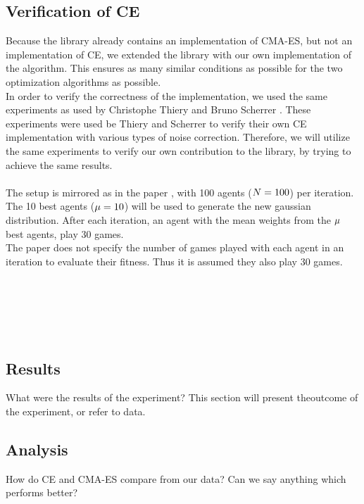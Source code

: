 \subsection{Verification of CE}
Because the \shark library already contains an implementation of 
CMA-ES, but not an implementation of CE, we extended the library 
with our own implementation of the algorithm. 
This ensures as many similar conditions as possible for 
the two optimization algorithms as possible.\\
In order to verify the correctness of the implementation, 
we used the same experiments as used by 
Christophe Thiery and Bruno Scherrer \citep{thiery:09}. 
These experiments were used be Thiery and Scherrer to 
verify their own CE implementation with various types of noise correction. 
Therefore, we will utilize the same experiments to verify our 
own contribution to the \shark library, by trying to achieve the same results.\\
\\
The setup is mirrored as in the paper \citep{thiery:09}, 
with 100 agents ($N = 100$) per iteration. 
The 10 best agents ($\mu = 10$) will be used 
to generate the new gaussian distribution. After each iteration, 
an agent with the mean weights from the $\mu$ best agents, 
play 30 games.\\
The paper does not specify the number of games 
played with each agent in an iteration to evaluate their fitness. 
Thus it is assumed they also play 30 games.\\
\\
\\
\\
\\
\\

\subsection{Results}

What were the results of the experiment? This section will
present theoutcome of the experiment, or refer to data.

\subsection{Analysis}

How do CE and CMA-ES compare from our data? Can we say anything 
which performs better?

